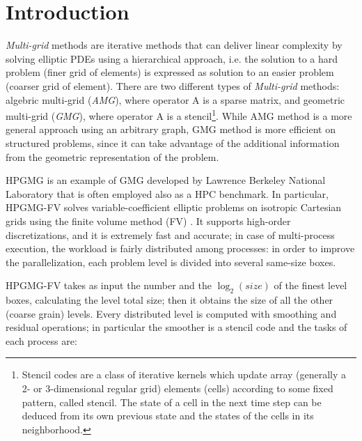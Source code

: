 \documentclass[review]{siamart1116}
\begin{document}
\section{Introduction}\label{sec:introduction}
\emph{Multi-grid} methods are iterative methods that can deliver
linear complexity by solving elliptic PDEs %
using a hierarchical approach, i.e. the solution to a hard problem (finer grid of elements) is expressed as solution to an easier problem (coarser grid of element).
There are two different types of \emph{Multi-grid} methods: algebric multi-grid (\emph{AMG}), where operator A is a sparse matrix, and geometric multi-grid (\emph{GMG}), where operator A is a stencil\footnote{Stencil codes are a class of iterative kernels which update array (generally a 2- or 3-dimensional regular grid) elements (cells) according to some fixed pattern, called stencil. The state of a cell in the next time step can be deduced from its own previous state and the states of the cells in its neighborhood.
}. While AMG method is a more general approach using an arbitrary graph, GMG method is more efficient on structured problems, since it can take advantage of the additional information from the geometric representation of the problem.

HPGMG is an example of GMG developed by Lawrence Berkeley National
Laboratory \cite{HPGMG} that is often employed also as a HPC benchmark. In particular, HPGMG-FV solves variable-coefficient elliptic problems on isotropic Cartesian grids using the finite volume method (FV) \cite{finitevolume}.
It supports high-order discretizations, and it is extremely fast and accurate; in case of multi-process execution, the workload is fairly distributed among processes: in order to improve the parallelization, each problem level is divided into several same-size boxes.


HPGMG-FV takes as input the number and the $\log_2 (size)$ of the finest level boxes, calculating the level
total size; then it obtains the size of all the other (coarse grain) levels. Every distributed level is computed with smoothing and residual operations; in particular the smoother is a stencil code and the tasks of each process are:
\end{document}
